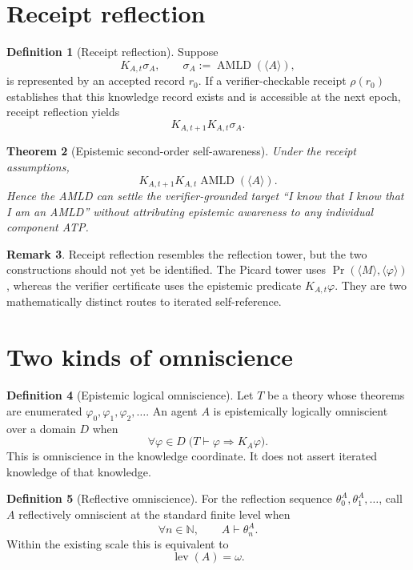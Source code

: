 \documentclass[11pt]{article}
\theoremstyle{definition}
\newtheorem{definition}{Definition}[section]
\newtheorem{remark}[definition]{Remark}
\theoremstyle{plain}
\newtheorem{theorem}[definition]{Theorem}
\newcommand{\lev}{\operatorname{lev}}
\newcommand{\Prv}{\operatorname{Pr}}
\newcommand{\AMLD}{\operatorname{AMLD}}
\begin{document}
\section{Receipt reflection}

\begin{definition}[Receipt reflection]
Suppose
\[
K_{A,t}\sigma_A,\qquad\sigma_A:=\AMLD(\langle A\rangle),
\]
is represented by an accepted record $r_0$. If a verifier-checkable receipt $\rho(r_0)$ establishes that this knowledge record exists and is accessible at the next epoch, receipt reflection yields
\[
K_{A,t+1}K_{A,t}\sigma_A.
\]
\end{definition}

\begin{theorem}[Epistemic second-order self-awareness]
Under the receipt assumptions,
\[
K_{A,t+1}K_{A,t}\AMLD(\langle A\rangle).
\]
Hence the AMLD can settle the verifier-grounded target ``I know that I know that I am an AMLD'' without attributing epistemic awareness to any individual component ATP.
\end{theorem}

\begin{remark}
Receipt reflection resembles the reflection tower, but the two constructions should not yet be identified. The Picard tower uses $\Prv(\langle M\rangle,\langle\varphi\rangle)$, whereas the verifier certificate uses the epistemic predicate $K_{A,t}\varphi$. They are two mathematically distinct routes to iterated self-reference.
\end{remark}

\section{Two kinds of omniscience}

\begin{definition}[Epistemic logical omniscience]
Let $T$ be a theory whose theorems are enumerated $\varphi_0,\varphi_1,\varphi_2,\ldots$. An agent $A$ is epistemically logically omniscient over a domain $D$ when
\[
\forall\varphi\in D\;\bigl(T\vdash\varphi\Longrightarrow K_A\varphi\bigr).
\]
This is omniscience in the knowledge coordinate. It does not assert iterated knowledge of that knowledge.
\end{definition}

\begin{definition}[Reflective omniscience]
For the reflection sequence $\theta_0^A,\theta_1^A,\ldots$, call $A$ reflectively omniscient at the standard finite level when
\[
\forall n\in\mathbb N,\qquad A\vdash\theta_n^A.
\]
Within the existing scale this is equivalent to
\[
\lev(A)=\omega.
\]
\end{definition}
\end{document}
